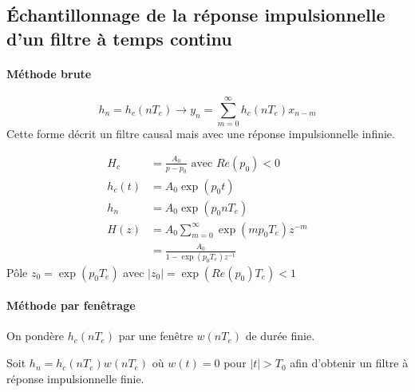 \documentclass[main.tex]{subfiles}
\begin{document}
\subsection{Échantillonnage de la réponse impulsionnelle d'un filtre à temps continu}

\paragraph{Méthode brute}
\[ h_n = h_c(nT_e) \rightarrow y_n = \sum_{m=0}^{\infty} h_c(nT_e)x_{n-m}\]
Cette forme décrit un filtre causal mais avec une réponse impulsionnelle infinie.

\begin{exemple}

\begin{align*}
H_c & = \frac{A_0}{p-p_0} \text{ avec } Re(p_0) < 0 \\
h_c(t) & = A_0 \exp(p_0 t) \\
h_n & = A_0 \exp (p_0 nT_e) \\
H(z) & = A_0 \sum_{m=0}^{\infty} \exp(mp_0T_e)z^{-m} \\
& = \frac{A_0}{1-\exp(p_0T_e)z^{-1}}
\end{align*}
Pôle $z_0 = \exp(p_0T_e)$ avec $|z_0|=\exp(Re(p_0)T_e) < 1$
\end{exemple}

\paragraph{Méthode par fenêtrage} On pondère $h_c(nT_e)$ par une fenêtre $w(nT_e)$ de durée finie.

Soit $h_n=h_c(nT_e)w(nT_e)$ où $w(t)=0$ pour $|t| > T_0$ afin d'obtenir un filtre à réponse impulsionnelle finie.
\end{document}
